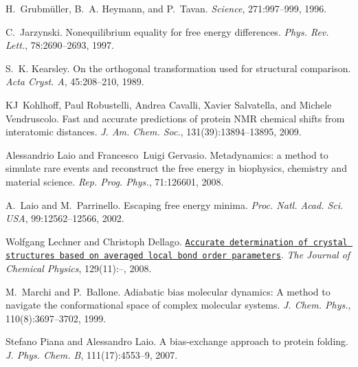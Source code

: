 \begin{DoxyDescription}
\item[\label{_CITEREF_Grubmuller3}%
\mbox{[}16\mbox{]}]H.~Grubm\"{u}ller, B.~A. Heymann, and P.~Tavan. {\itshape Science}, 271\+:997--999, 1996.


\item[\label{_CITEREF_jarzynski}%
\mbox{[}17\mbox{]}]C.~Jarzynski. Nonequilibrium equality for free energy differences. {\itshape Phys. Rev. Lett.}, 78\+:2690--2693, 1997.


\item[\label{_CITEREF_kearsley}%
\mbox{[}18\mbox{]}]S.~K. Kearsley. On the orthogonal transformation used for structural comparison. {\itshape Acta Cryst. A}, 45\+:208--210, 1989.


\item[\label{_CITEREF_Kohlhoff:2009us}%
\mbox{[}19\mbox{]}]K\+J~Kohlhoff, Paul Robustelli, Andrea Cavalli, Xavier Salvatella, and Michele Vendruscolo. Fast and accurate predictions of protein N\+M\+R chemical shifts from interatomic distances. {\itshape J. Am. Chem. Soc.}, 131(39)\+:13894--13895, 2009.


\item[\label{_CITEREF_gerv-laio09review}%
\mbox{[}20\mbox{]}]Alessandrio Laio and Francesco~Luigi Gervasio. Metadynamics\+: a method to simulate rare events and reconstruct the free energy in biophysics, chemistry and material science. {\itshape Rep. Prog. Phys.}, 71\+:126601, 2008.


\item[\label{_CITEREF_metad}%
\mbox{[}21\mbox{]}]A.~Laio and M.~Parrinello. Escaping free energy minima. {\itshape Proc. Natl. Acad. Sci. U\+S\+A}, 99\+:12562--12566, 2002.


\item[\label{_CITEREF_dellago-q6}%
\mbox{[}22\mbox{]}]Wolfgang Lechner and Christoph Dellago. \href{http://scitation.aip.org/content/aip/journal/jcp/129/11/10.1063/1.2977970}{\tt Accurate determination of crystal structures based on averaged local bond order parameters}. {\itshape The Journal of Chemical Physics}, 129(11)\+:--, 2008. 


\item[\label{_CITEREF_ballone}%
\mbox{[}23\mbox{]}]M.~Marchi and P.~Ballone. Adiabatic bias molecular dynamics\+: A method to navigate the conformational space of complex molecular systems. {\itshape J. Chem. Phys.}, 110(8)\+:3697--3702, 1999.


\item[\label{_CITEREF_piana}%
\mbox{[}24\mbox{]}]Stefano Piana and Alessandro Laio. A bias-\/exchange approach to protein folding. {\itshape J. Phys. Chem. B}, 111(17)\+:4553--9, 2007.



\end{DoxyDescription}
